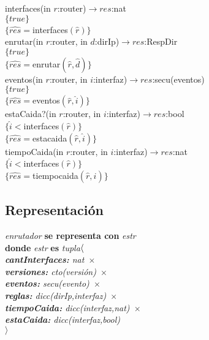 interfaces(in $r$:router)$\longrightarrow res$:nat\\
$\{true\}$\\
$\{\widehat{res}=$interfaces$(\widehat{r})\}$\\

enrutar(in $r$:router, in $d$:dirIp)$\longrightarrow res$:RespDir\\
$\{true\}$\\
$\{\widehat{res}=$enrutar$(\widehat{r},\widehat{d})\}$\\

eventos(in $r$:router, in $i$:interfaz)$\longrightarrow res$:secu(eventos)\\
$\{true\}$\\
$\{\widehat{res}=$eventos$(\widehat{r},\widehat{i})\}$\\

estaCaida?(in $r$:router, in $i$:interfaz)$\longrightarrow res$:bool\\
$\{\widehat{i} < $interfaces$(\widehat{r})\}$\\
$\{\widehat{res}=$estacaida$(\widehat{r},\widehat{i})\}$\\

tiempoCaida(in $r$:router, in $i$:interfaz)$\longrightarrow res$:nat\\
$\{\widehat{i} < $interfaces$(\widehat{r})\}$\\
$\{\widehat{res}=$tiempocaida$(\widehat{r},\widehat{i})\}$\\


\subsection*{Representaci\'on}
\textit{enrutador} \textbf{se representa con} \textit{estr}\\
\textbf{donde} \textit{estr} \textbf{es} \textit{tupla$ \\ \langle$\ \\ \textbf{cantInterfaces:} nat\ 	$\times$\   \\ \textbf{versiones:} cto(versi\'on)\ 	$\times$\  \\ \textbf{eventos:} secu(evento)\ $\times$\ \\ \textbf{reglas:} dicc(dirIp,interfaz)\ $\times$\ \\ \textbf{tiempoCaida:} dicc(interfaz,nat)\ $\times$\ \\ \textbf{estaCaida:} dicc(interfaz,bool) \\ $\rangle$}


